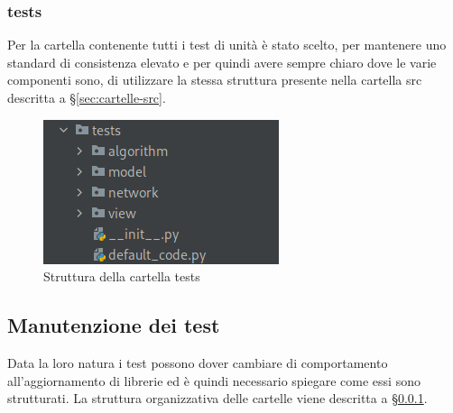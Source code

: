 \subsubsection{tests}
\label{sec:cartelle-tests}
Per la cartella contenente tutti i test di unità è stato scelto, per mantenere uno standard di consistenza elevato e per quindi avere sempre chiaro dove le varie componenti sono, di utilizzare la stessa struttura presente nella cartella src descritta a \S{}\ref{sec:cartelle-src}.
\begin{figure}[H]
    \centering
    \includegraphics[scale = 0.5]{components/img/struttura-cartella-tests.png}
    \caption{Struttura della cartella tests}
    \label{fig:Struttura della cartella tests}
\end{figure}

\subsection{Manutenzione dei test}
Data la loro natura i test possono dover cambiare di comportamento all'aggiornamento di librerie ed è quindi necessario spiegare come essi sono strutturati. La struttura organizzativa delle cartelle viene descritta a \S{}\ref{sec:cartelle-tests}.
